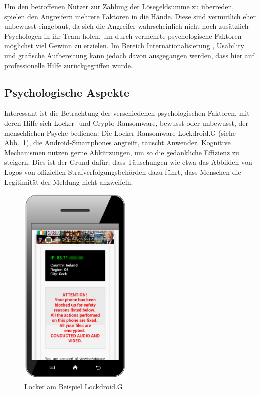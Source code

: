 Um den betroffenen Nutzer zur Zahlung der Lösegeldsumme zu überreden, spielen den Angreifern mehrere Faktoren in die Hände. Diese sind vermutlich eher unbewusst eingebaut, da sich die Angreifer wahrscheinlich nicht noch zusätzlich Psychologen in ihr Team holen, um durch vermehrte psychologische Faktoren möglichst viel Gewinn zu erzielen. Im Bereich Internationalisierung \cite{faktoren:l18n}, Usability und grafische Aufbereitung \cite{faktoren:grafik} \cite{evolution} kann jedoch davon ausgegangen werden, dass hier auf professionelle Hilfe zurückgegriffen wurde.

\subsection{Psychologische Aspekte}

Interessant ist die Betrachtung der verschiedenen psychologischen Faktoren, mit deren Hilfe sich Locker- und Crypto-Ransomware, bewusst oder unbewusst, der menschlichen Psyche bedienen:
Die Locker-Ransomware \glqq Lockdroid.G\grqq{} (siehe Abb.~\ref{fig:lockdroid}), die Android-Smartphones angreift, täuscht Anwender. Kognitive Mechanismen nutzen gerne Abkürzungen, um so die gedankliche Effizienz zu steigern. Dies ist der Grund dafür, dass Täuschungen wie etwa das Abbilden von Logos von offiziellen Strafverfolgungsbehörden dazu führt, dass Menschen die Legitimität der Meldung nicht anzweifeln. 

\begin{figure}
  \begin{center}
    \includegraphics[width=0.48\textwidth]{img/android_locker.png}
  \end{center}
  \caption{Locker am Beispiel \glqq Lockdroid.G\grqq{} \cite{evolution}}
  \label{fig:lockdroid}
\end{figure}


